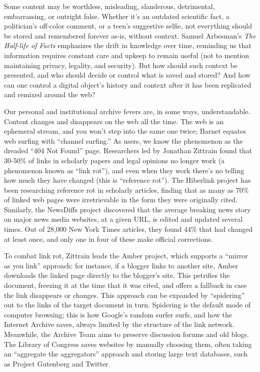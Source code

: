 Some content may be worthless, misleading, slanderous, detrimental, embarrassing, or outright false. Whether it's an outdated scientific fact, a politician's off-color comment, or a teen's suggestive selfie, not everything should be stored and remembered forever as-is, without context. Samuel Arbesman's \emph{The Half-life of Facts} emphasizes the drift in knowledge over time, reminding us that information requires constant care and upkeep to remain useful (not to mention maintaining privacy, legality, and security).\autocite{arbesman_half-life_2013} But how should such context be presented, and who should decide or control what is saved and stored? And how can one control a digital object's history and context after it has been replicated and remixed around the web?

Our personal and institutional archive fevers are, in some ways, understandable. Content changes and disappears on the web all the time. The web is an ephemeral stream, and you won't step into the same one twice; Barnet equates web surfing with ``channel surfing.''\autocite[217]{barnet_pack-rat_2001} As users, we know the phenomenon as the dreaded ``404 Not Found'' page. Researchers led by Jonathan Zittrain found that 30-50\% of links in scholarly papers and legal opinions no longer work (a phenomenon known as ``link rot''), and even when they work there's no telling how much they have changed (this is ``reference rot'').\autocite{zittrain_perma:_2013} The Hiberlink project has been researching reference rot in scholarly articles, finding that as many as 70\% of linked web pages were irretrievable in the form they were originally cited.\autocite{_one_2015} Similarly, the NewsDiffs project discovered that the average breaking news story on major news media websites, at a given URL, is edited and updated several times. Out of 28,000 New York Times articles, they found 44\% that had changed at least once, and only one in four of these make official corrections.\autocite{lee_version_2013}

To combat link rot, Zittrain leads the Amber project, which supports a ``mirror as you link'' approach: for instance, if a blogger links to another site, Amber downloads the linked page directly to the blogger's site.\autocite[See http://amberlink.org; see also][]{zittrain_fourth_2010} This petrifies the document, freezing it at the time that it was cited, and offers a fallback in case the link disappears or changes. This approach can be expanded by ``spidering'' out to the links of the target document in turn. Spidering is the default mode of computer browsing; this is how Google's random surfer surfs, and how the Internet Archive saves, always limited by the structure of the link network. Meanwhile, the Archive Team aims to preserve discussion forums and old blogs. The Library of Congress saves websites by manually choosing them, often taking an ``aggregate the aggregators'' approach and storing large text databases, such as Project Gutenberg and Twitter.

